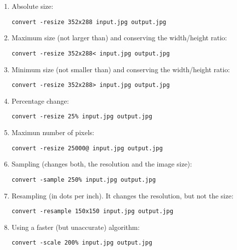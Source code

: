 \begin{enumerate}

\item Absolute size:

\begin{lstlisting}
convert -resize 352x288 input.jpg output.jpg
\end{lstlisting}

\item Maximum size (not larger than) and conserving the width/height ratio:

\begin{lstlisting}
convert -resize 352x288< input.jpg output.jpg
\end{lstlisting}

\item Minimum size (not smaller than) and conserving the width/height ratio:

\begin{lstlisting}
convert -resize 352x288> input.jpg output.jpg
\end{lstlisting}

\item Percentage change:

\begin{lstlisting}
convert -resize 25% input.jpg output.jpg
\end{lstlisting}

\item Maximun number of pixels:

\begin{lstlisting}
convert -resize 25000@ input.jpg output.jpg
\end{lstlisting}

\item Sampling (changes both, the resolution and the image size):
\begin{lstlisting}
convert -sample 250% input.jpg output.jpg
\end{lstlisting}

\item Resampling (in dots per inch). It changes the resolution, but not the size:

\begin{lstlisting}
convert -resample 150x150 input.jpg output.jpg
\end{lstlisting}

\item Using a faster (but unaccurate) algorithm:

\begin{lstlisting}
convert -scale 200% input.jpg output.jpg
\end{lstlisting}


\end{enumerate}
